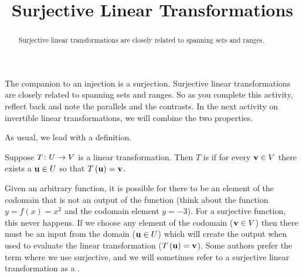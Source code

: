 \documentclass{ximera}
\title{Surjective Linear Transformations}
\begin{document}
\begin{abstract}
  Surjective linear transformations are closely related to spanning sets and ranges.
\end{abstract}
\maketitle



The companion to an injection is a surjection.  Surjective linear transformations are closely related to spanning sets and ranges.  So as you complete this activity, reflect back and note the parallels and the contrasts.  In the next activity on invertible linear transformations, we will combine the two properties.

As usual, we lead with a definition.

\begin{definition}
Suppose $T\colon U\rightarrow V$ is a linear transformation.  Then $T$ is  if for every $\mathbf{v}\in V$ there exists a $\mathbf{u}\in U$ so that $T\left(\mathbf{u}\right)=\mathbf{v}$.



\end{definition}

Given an arbitrary function, it is possible for there to be an element of the codomain that is not an output of the function (think about the function $y=f(x)=x^2$ and the codomain element $y=-3$).  For a surjective function, this never happens.  If we choose any element of the codomain ($\mathbf{v}\in V$) then there must be an input from the domain ($\mathbf{u}\in U$) which will create the output when used to evaluate the linear transformation ($T\left(\mathbf{u}\right)=\mathbf{v}$).  Some authors prefer the term  where we use surjective, and we will sometimes refer to a surjective linear transformation as a .
\end{document}
